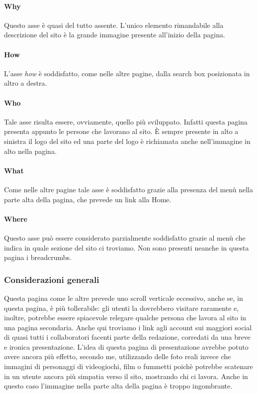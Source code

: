 \documentclass[../ProgettoTecWeb2.tex]{subfiles}
\begin{document}
			\paragraph{Why}
			Questo asse è quasi del tutto assente. L'unico elemento rimandabile alla descrizione del sito è la grande immagine presente all'inizio della pagina.

			\paragraph{How}
			L'asse \textit{how} è soddisfatto, come nelle altre pagine, dalla search box posizionata in altro a destra.
			
			\paragraph{Who}
			Tale asse risulta essere, ovviamente, quello più sviluppato. Infatti questa pagina presenta appunto le persone che lavorano al sito. È sempre presente in alto a sinistra il logo del sito ed una parte del logo è richiamata anche nell'immagine in alto nella pagina.

			\paragraph{What}
			Come nelle altre pagine tale asse è soddisfatto grazie alla presenza del menù nella parte alta della pagina, che prevede un link alla Home.

			\paragraph{Where}
			Questo asse può essere considerato parzialmente soddisfatto grazie al menù che indica in quale sezione del sito ci troviamo. Non sono presenti neanche in questa pagina i breadcrumbs.
		
		\subsubsection{Considerazioni generali}
		Questa pagina come le altre prevede uno scroll verticale eccessivo, anche se, in questa pagina, è più tollerabile: gli utenti la dovrebbero visitare raramente e, inoltre, potrebbe essere spiacevole relegare qualche persona che lavora al sito in una pagina secondaria. Anche qui troviamo i link agli account sui maggiori social di quasi tutti i collaboratori facenti parte della redazione, corredati da una breve e ironica presentazione. L'idea di questa pagina di presentazione avrebbe potuto avere ancora più effetto, secondo me, utilizzando delle foto reali invece che immagini di personaggi di videogiochi, film o fummetti poichè potrebbe scatenare in un utente ancora più simpatia verso il sito, mostrando chi ci lavora. Anche in questo caso l'immagine nella parte alta della pagina è troppo ingombrante.
\end{document}
